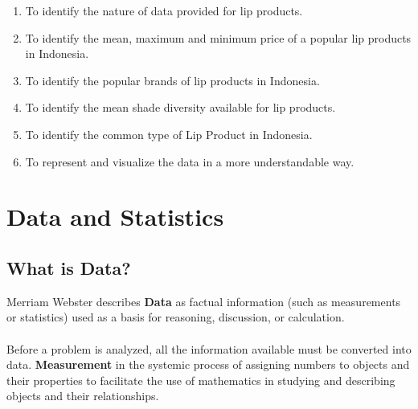 \documentclass{article}
\begin{document}
\begin{enumerate}
    \item To identify the nature of data provided for lip products.
    \item To identify the mean, maximum and minimum price of a popular lip products in Indonesia.
    \item To identify the popular brands of lip products in Indonesia.
    \item To identify the mean shade diversity available for lip products.
    \item To identify the common type of Lip Product in Indonesia.
    \item To represent and visualize the data in a more understandable way.
\end{enumerate}


\newpage

\section{Data and Statistics}

\subsection{What is Data?}
Merriam Webster describes \textbf{Data} as factual information (such as measurements or statistics) used as a basis for reasoning,  discussion, or calculation.
\\ \\
Before a problem is analyzed, all the information available must be converted into data. \textbf{Measurement} in the systemic process of assigning numbers to objects and their properties to facilitate the use of mathematics in studying and describing  objects and their relationships.
\end{document}
